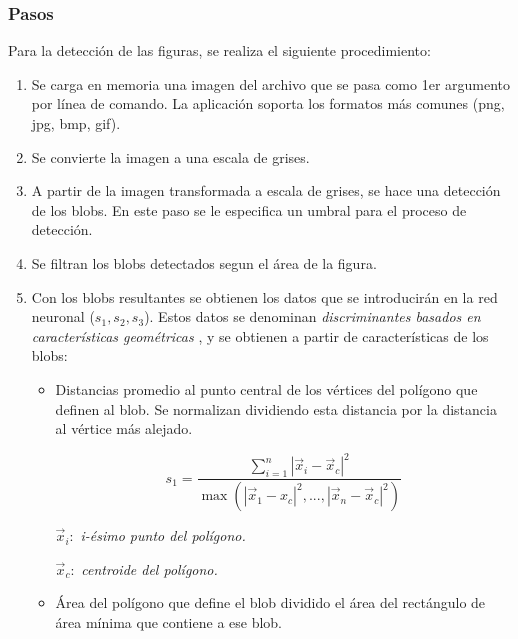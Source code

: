 \documentclass[pdftex,a4paper,10.5pt]{article}
\begin{document}
\subsubsection{Pasos}
Para la detecci\'on de las figuras, se realiza el siguiente procedimiento:
			\begin{enumerate}
			  	\item	Se carga en memoria una imagen del archivo que se pasa como 1er
			  	argumento por l\'inea de comando. La aplicaci\'on soporta los formatos m\'as
			  	comunes (png, jpg, bmp, gif).
				\item	Se convierte la imagen a una escala de grises.
				\item 	A partir de la imagen transformada a escala de grises, se hace una
				detecci\'on de los blobs. En este paso se le especifica un umbral para el
				proceso de detecci\'on.
				\item	Se filtran los blobs detectados segun el \'area de la figura.
				\item	Con los blobs resultantes se obtienen los datos que se introducir\'an
				en la red neuronal ($ s_{1}, s_{2}, s_{3} $). Estos datos se denominan \textit{discriminantes basados en caracter\'isticas geom\'etricas} \cite{yangGillies} , y se obtienen a partir de 				           		caracter\'isticas de los blobs:
					\begin{itemize}
                      \item	Distancias promedio al punto central de los v\'ertices
                      del pol\'igono que definen al blob. Se normalizan
                      dividiendo esta distancia por la distancia al v\'ertice m\'as
                      alejado.
                      
  					  \begin{equation} s_{1} = \frac { \sum_{i=1}^{n} { {|\vec {x}_{i} - \vec{x}_{c}|^{2}} } }
				      { \max ( {|\vec{x}_{1} - x_{c}|^{2}}, ... , {|\vec{x}_{n} - \vec{x}_{c}|^{2}} ) }		\end{equation}

					  $ \vec{x}_{i}:  $	 \textit{i-\'esimo punto del pol\'igono. }
					  
					  $ \vec{x}_{c}:  $	 \textit{centroide del pol\'igono. }
						
                      \item	\'Area del pol\'igono que define el blob dividido el 
                      \'area del rect\'angulo de \'area m\'inima que contiene a ese blob.
                      

\end{itemize}
\end{enumerate}
\end{document}
